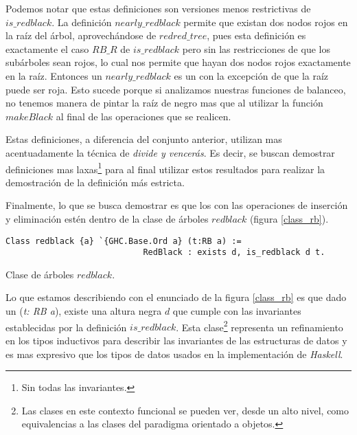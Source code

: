 Podemos notar que estas definiciones son versiones menos restrictivas de 
\hyperref[inductive_isRedB]{$is\_redblack$}. La definici\'on 
\hyperref[inductive_isRedB]{$nearly\_redblack$} permite que existan dos nodos rojos en la ra\'iz del 
\'arbol, aprovech\'andose de \hyperref[inductive_isRedB]{$redred\_tree$}, pues esta definici\'on es 
exactamente el caso $RB\_R$ de \hyperref[inductive_isRedB]{$is\_redblack$} pero sin las 
restricciones de que los sub\'arboles sean rojos, lo cual nos permite que hayan dos nodos rojos 
exactamente en la ra\'iz. Entonces un \hyperref[inductive_isRedB]{$nearly\_redblack$} es un {\arn} 
con la excepci\'on de que la ra\'iz puede ser roja. Esto sucede porque si analizamos nuestras funciones de 
balanceo, no tenemos manera de pintar la raíz de negro mas que al utilizar la función 
\hyperref[raiz_negra_func]{$makeBlack$} al final de las operaciones que se realicen. 

Estas definiciones, a diferencia del conjunto anterior, utilizan mas acentuadamente la t\'ecnica de 
\textit{divide y vencerás}. Es decir, se buscan demostrar definiciones mas laxas\footnote{Sin todas 
las invariantes.} para al final utilizar estos resultados para realizar la demostraci\'on de la 
definición m\'as estricta.

Finalmente, lo que se busca demostrar es que los {\arns} con las operaciones de inserci\'on y
eliminaci\'on est\'en dentro de la clase de \'arboles $redblack$ (figura \ref{class_rb}).

\begin{listing}[!ht]
\centering
\captionsetup{justification=centering}
\begin{verbatim}
Class redblack {a} `{GHC.Base.Ord a} (t:RB a) :=
                            RedBlack : exists d, is_redblack d t.
\end{verbatim}
\caption{Clase de \'arboles $redblack$.}
\label{class_rb}
\end{listing}

Lo que estamos describiendo con el enunciado de la figura \ref{class_rb} es que dado un {\arn} 
(\textit{t: RB a}), existe una altura negra $d$ que cumple con las invariantes establecidas por la 
definici\'on \hyperref[inductive_isRedB]{$is\_redblack$}. Esta clase\footnote{Las clases en este 
contexto funcional se pueden ver, desde un alto nivel, como equivalencias a las clases del paradigma 
orientado a objetos.} representa un refinamiento en los tipos inductivos para describir las 
invariantes de las estructuras de datos y es mas expresivo que los tipos de datos usados en la 
implementaci\'on de \textit{Haskell}.

